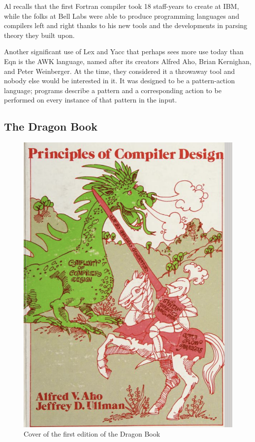 Al recalls that the first Fortran compiler took 18 staff-years to create at IBM,
while the folks at Bell Labs were able to produce programming languages and compilers left and right
thanks to his new tools and the developments in parsing theory they built upon.

Another significant use of Lex and Yacc that perhaps sees more use today than Eqn is the AWK language,
named after its creators Alfred Aho, Brian Kernighan, and Peter Weinberger.
At the time, they considered it a throwaway tool and nobody else would be interested in it.
It was designed to be a pattern-action language; programs describe a pattern and a corresponding
action to be performed on every instance of that pattern in the input.


\subsection{The Dragon Book}

\begin{figure}[h]
	\centering
	\includegraphics[height=0.3\textheight]{resource/software/unix/dragon-book-1ed.png}
	\caption{Cover of the first edition of the Dragon Book}
	\label{fig:dragon-book}
\end{figure}

